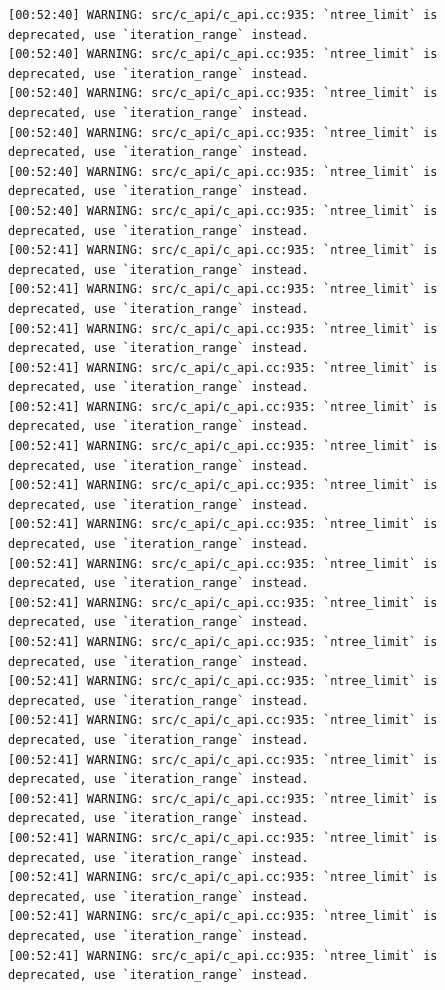 \documentclass[
  letterpaper,
  DIV=11,
  numbers=noendperiod]{scrartcl}
\begin{document}
\begin{verbatim}
[00:52:40] WARNING: src/c_api/c_api.cc:935: `ntree_limit` is deprecated, use `iteration_range` instead.
[00:52:40] WARNING: src/c_api/c_api.cc:935: `ntree_limit` is deprecated, use `iteration_range` instead.
[00:52:40] WARNING: src/c_api/c_api.cc:935: `ntree_limit` is deprecated, use `iteration_range` instead.
[00:52:40] WARNING: src/c_api/c_api.cc:935: `ntree_limit` is deprecated, use `iteration_range` instead.
[00:52:40] WARNING: src/c_api/c_api.cc:935: `ntree_limit` is deprecated, use `iteration_range` instead.
[00:52:40] WARNING: src/c_api/c_api.cc:935: `ntree_limit` is deprecated, use `iteration_range` instead.
[00:52:41] WARNING: src/c_api/c_api.cc:935: `ntree_limit` is deprecated, use `iteration_range` instead.
[00:52:41] WARNING: src/c_api/c_api.cc:935: `ntree_limit` is deprecated, use `iteration_range` instead.
[00:52:41] WARNING: src/c_api/c_api.cc:935: `ntree_limit` is deprecated, use `iteration_range` instead.
[00:52:41] WARNING: src/c_api/c_api.cc:935: `ntree_limit` is deprecated, use `iteration_range` instead.
[00:52:41] WARNING: src/c_api/c_api.cc:935: `ntree_limit` is deprecated, use `iteration_range` instead.
[00:52:41] WARNING: src/c_api/c_api.cc:935: `ntree_limit` is deprecated, use `iteration_range` instead.
[00:52:41] WARNING: src/c_api/c_api.cc:935: `ntree_limit` is deprecated, use `iteration_range` instead.
[00:52:41] WARNING: src/c_api/c_api.cc:935: `ntree_limit` is deprecated, use `iteration_range` instead.
[00:52:41] WARNING: src/c_api/c_api.cc:935: `ntree_limit` is deprecated, use `iteration_range` instead.
[00:52:41] WARNING: src/c_api/c_api.cc:935: `ntree_limit` is deprecated, use `iteration_range` instead.
[00:52:41] WARNING: src/c_api/c_api.cc:935: `ntree_limit` is deprecated, use `iteration_range` instead.
[00:52:41] WARNING: src/c_api/c_api.cc:935: `ntree_limit` is deprecated, use `iteration_range` instead.
[00:52:41] WARNING: src/c_api/c_api.cc:935: `ntree_limit` is deprecated, use `iteration_range` instead.
[00:52:41] WARNING: src/c_api/c_api.cc:935: `ntree_limit` is deprecated, use `iteration_range` instead.
[00:52:41] WARNING: src/c_api/c_api.cc:935: `ntree_limit` is deprecated, use `iteration_range` instead.
[00:52:41] WARNING: src/c_api/c_api.cc:935: `ntree_limit` is deprecated, use `iteration_range` instead.
[00:52:41] WARNING: src/c_api/c_api.cc:935: `ntree_limit` is deprecated, use `iteration_range` instead.
[00:52:41] WARNING: src/c_api/c_api.cc:935: `ntree_limit` is deprecated, use `iteration_range` instead.
[00:52:41] WARNING: src/c_api/c_api.cc:935: `ntree_limit` is deprecated, use `iteration_range` instead.

\end{verbatim}
\end{document}
